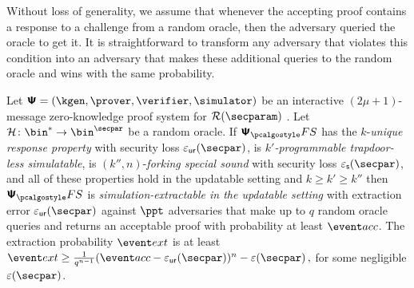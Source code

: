 Without loss of generality, we assume that whenever the accepting proof contains a
response to a challenge from a random oracle, then the adversary queried the oracle
to get it. It is straightforward to transform any adversary that violates this
condition into an adversary that makes these additional queries to the random oracle
and wins with the same probability.

\begin{theorem}
  \label{thm:se}
  Let $\ps = (\kgen, \prover, \verifier, \simulator)$ be an interactive
  $(2 \mu + 1)$-message zero-knowledge proof system for $\RELGEN(\secparam)$
  . Let
  $\ro\colon \bin^{*} \to \bin^{\secpar}$ be a random oracle. If $\psfs$ has the
  $k$-\emph{unique response property} with security loss $\epsur(\secpar)$, is
  \emph{$k'$-programmable trapdoor-less simulatable}, is $(k'', n)$-\emph{forking
    special sound} with security loss $\epss(\secpar)$, and all of these properties
  hold in the updatable setting and $k \geq k' \geq k''$ then $\psfs$ is
  \emph{simulation-extractable in the updatable setting} with extraction error
  \textcolor{red}{$\epsur(\secpar)$} against $\ppt$ adversaries that make up to $q$ random oracle
  queries and returns an acceptable proof with probability at least $\accProb$.  The
  extraction probability $\extProb$ is at least
  \textcolor{red}{\( \extProb \geq \frac{1}{q^{n - 1}} (\accProb - \epsur(\secpar))^{n}
  -\eps(\secpar)\,, \)} for some negligible $\eps(\secpar)$.
\end{theorem}
